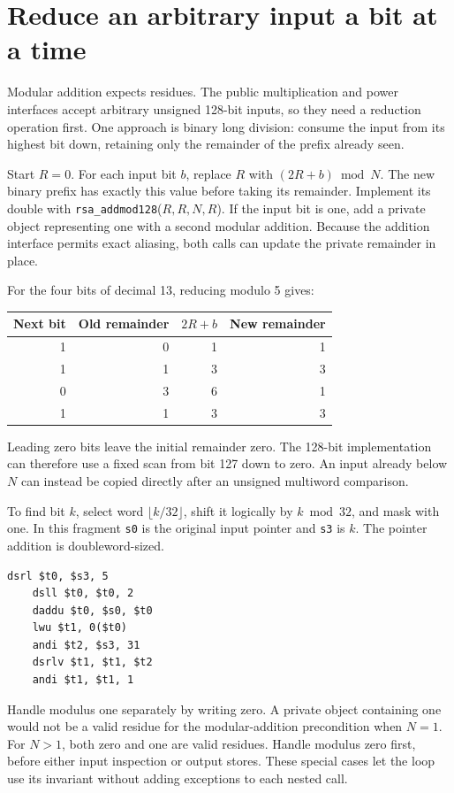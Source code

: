 \section{Reduce an arbitrary input a bit at a time}
Modular addition expects residues. The public multiplication and power interfaces
accept arbitrary unsigned 128-bit inputs, so they need a reduction operation first.
One approach is binary long division: consume the input from its highest bit down,
retaining only the remainder of the prefix already seen.

Start \(R=0\). For each input bit \(b\), replace \(R\) with \((2R+b)\bmod N\).
The new binary prefix has exactly this value before taking its remainder. Implement
its double with \texttt{rsa\_addmod128}(\(R,R,N,R\)). If the input bit is one, add
a private object representing one with a second modular addition. Because the addition
interface permits exact aliasing, both calls can update the private remainder in place.

For the four bits of decimal 13, reducing modulo 5 gives:
\begin{center}
  \begin{tabular}{rrrr}
    Next bit & Old remainder & \(2R+b\) & New remainder \\
    \hline
    1        & 0             & 1        & 1             \\
    1        & 1             & 3        & 3             \\
    0        & 3             & 6        & 1             \\
    1        & 1             & 3        & 3             \\
  \end{tabular}
\end{center}
Leading zero bits leave the initial remainder zero. The 128-bit implementation can
therefore use a fixed scan from bit 127 down to zero. An input already below \(N\)
can instead be copied directly after an unsigned multiword comparison.

To find bit \(k\), select word \(\lfloor k/32\rfloor\), shift it logically by
\(k\bmod32\), and mask with one. In this fragment \texttt{s0} is the original
input pointer and \texttt{s3} is \(k\). The pointer addition is doubleword-sized.

\begin{verbatim}
dsrl $t0, $s3, 5
    dsll $t0, $t0, 2
    daddu $t0, $s0, $t0
    lwu $t1, 0($t0)
    andi $t2, $s3, 31
    dsrlv $t1, $t1, $t2
    andi $t1, $t1, 1
\end{verbatim}

Handle modulus one separately by writing zero. A private object containing one would
not be a valid residue for the modular-addition precondition when \(N=1\). For \(N>1\),
both zero and one are valid residues. Handle modulus zero first, before either input
inspection or output stores. These special cases let the loop use its invariant
without adding exceptions to each nested call.
